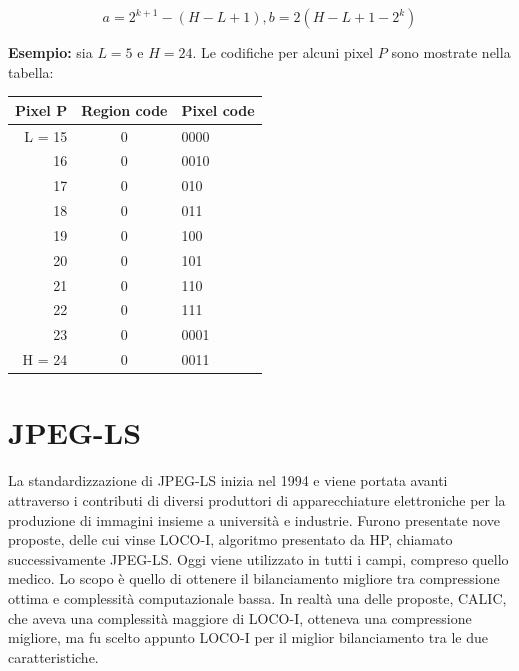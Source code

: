\[a = 2^{k+1} - (H - L + 1),  b = 2(H - L + 1 - 2^k)\]

\vspace{5mm}

\textbf{Esempio:} sia \(L = 5\) e \(H = 24\). Le codifiche per alcuni pixel \(P\) sono mostrate nella tabella:

\begin{table}[htbp!]
\centering
\begin{tabular}{rcl}
\multicolumn{1}{c}{\textbf{Pixel P}} & \textbf{Region code} & \multicolumn{1}{c}{\textbf{Pixel code}}  \\ 
\hline
L = 15                               & 0                    & 0000                                     \\
16                                   & 0                    & 0010                                     \\
17                                   & 0                    & 010                                      \\
18                                   & 0                    & 011                                      \\
19                                   & 0                    & 100                                      \\
20                                   & 0                    & 101                                      \\
21                                   & 0                    & 110                                      \\
22                                   & 0                    & 111                                      \\
23                                   & 0                    & 0001                                     \\
H = 24                               & 0                    & 0011                                    
\end{tabular}
\end{table}
\FloatBarrier

\section{JPEG-LS}
La standardizzazione di JPEG-LS inizia nel 1994 e viene portata avanti attraverso i contributi di diversi produttori di apparecchiature elettroniche per la produzione di immagini insieme a università e industrie. Furono presentate nove proposte, delle cui vinse LOCO-I, algoritmo presentato da HP, chiamato successivamente JPEG-LS. Oggi viene utilizzato in tutti i campi, compreso quello medico. Lo scopo è quello di ottenere il bilanciamento migliore tra compressione ottima e complessità computazionale bassa. In realtà una delle proposte, CALIC, che aveva una complessità maggiore di LOCO-I, otteneva una compressione migliore, ma fu scelto appunto LOCO-I per il miglior bilanciamento tra le due caratteristiche.

